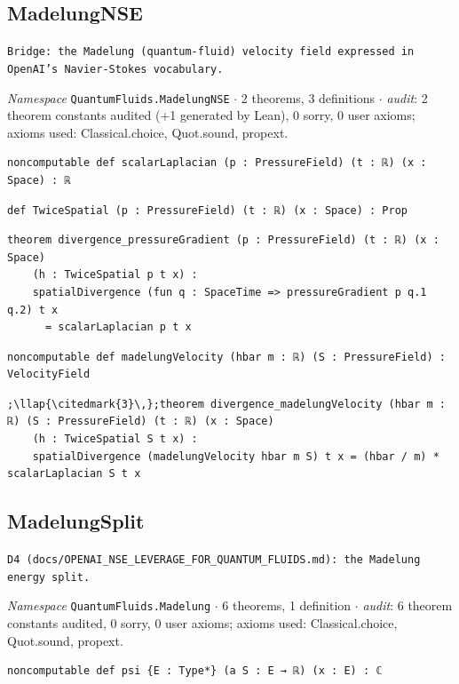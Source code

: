 \subsection{MadelungNSE}\label{appA:MadelungNSE}
{\footnotesize\raggedright\texttt{Bridge: the Madelung (quantum-\allowbreak{}fluid) velocity field expressed in OpenAI's Navier-\allowbreak{}Stokes vocabulary.\allowbreak{}}\par}
{\footnotesize\raggedright\emph{Namespace} \texttt{QuantumFluids.\allowbreak{}MadelungNSE} $\cdot$ 2 theorems, 3 definitions $\cdot$ \emph{audit}: 2 theorem constants audited (+1 generated by Lean), 0 sorry, 0 user axioms; axioms used: Classical.choice, Quot.sound, propext.\par}
\vspace{1pt}
\begin{lstlisting}[style=leancat]
noncomputable def scalarLaplacian (p : PressureField) (t : ℝ) (x : Space) : ℝ
\end{lstlisting}

\begin{lstlisting}[style=leancat]
def TwiceSpatial (p : PressureField) (t : ℝ) (x : Space) : Prop
\end{lstlisting}

\begin{lstlisting}[style=leancat]
theorem divergence_pressureGradient (p : PressureField) (t : ℝ) (x : Space)
    (h : TwiceSpatial p t x) :
    spatialDivergence (fun q : SpaceTime => pressureGradient p q.1 q.2) t x
      = scalarLaplacian p t x
\end{lstlisting}

\begin{lstlisting}[style=leancat]
noncomputable def madelungVelocity (hbar m : ℝ) (S : PressureField) : VelocityField
\end{lstlisting}

\begin{lstlisting}[style=leancat]
;\llap{\citedmark{3}\,};theorem divergence_madelungVelocity (hbar m : ℝ) (S : PressureField) (t : ℝ) (x : Space)
    (h : TwiceSpatial S t x) :
    spatialDivergence (madelungVelocity hbar m S) t x = (hbar / m) * scalarLaplacian S t x
\end{lstlisting}

\subsection{MadelungSplit}\label{appA:MadelungSplit}
{\footnotesize\raggedright\texttt{D4 (docs/\allowbreak{}OPENAI\_\allowbreak{}NSE\_\allowbreak{}LEVERAGE\_\allowbreak{}FOR\_\allowbreak{}QUANTUM\_\allowbreak{}FLUIDS.\allowbreak{}md): the Madelung energy split.\allowbreak{}}\par}
{\footnotesize\raggedright\emph{Namespace} \texttt{QuantumFluids.\allowbreak{}Madelung} $\cdot$ 6 theorems, 1 definition $\cdot$ \emph{audit}: 6 theorem constants audited, 0 sorry, 0 user axioms; axioms used: Classical.choice, Quot.sound, propext.\par}
\vspace{1pt}
\begin{lstlisting}[style=leancat]
noncomputable def psi {E : Type*} (a S : E → ℝ) (x : E) : ℂ
\end{lstlisting}

